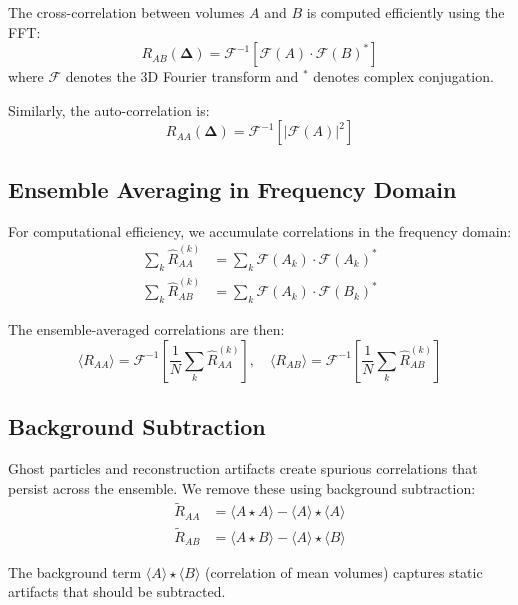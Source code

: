 \documentclass[11pt,a4paper]{article}
\begin{document}
The cross-correlation between volumes $A$ and $B$ is computed efficiently using the FFT:
\begin{equation}
    R_{AB}(\bm{\Delta}) = \mathcal{F}^{-1}\left[\mathcal{F}(A) \cdot \mathcal{F}(B)^*\right]
\end{equation}
where $\mathcal{F}$ denotes the 3D Fourier transform and $^*$ denotes complex conjugation.

Similarly, the auto-correlation is:
\begin{equation}
    R_{AA}(\bm{\Delta}) = \mathcal{F}^{-1}\left[|\mathcal{F}(A)|^2\right]
\end{equation}

\subsection{Ensemble Averaging in Frequency Domain}

For computational efficiency, we accumulate correlations in the frequency domain:
\begin{align}
    \sum_k \hat{R}_{AA}^{(k)} &= \sum_k \mathcal{F}(A_k) \cdot \mathcal{F}(A_k)^* \\
    \sum_k \hat{R}_{AB}^{(k)} &= \sum_k \mathcal{F}(A_k) \cdot \mathcal{F}(B_k)^*
\end{align}

The ensemble-averaged correlations are then:
\begin{equation}
    \langle R_{AA} \rangle = \mathcal{F}^{-1}\left[\frac{1}{N}\sum_k \hat{R}_{AA}^{(k)}\right], \quad
    \langle R_{AB} \rangle = \mathcal{F}^{-1}\left[\frac{1}{N}\sum_k \hat{R}_{AB}^{(k)}\right]
\end{equation}

\subsection{Background Subtraction}

Ghost particles and reconstruction artifacts create spurious correlations that persist across the ensemble. We remove these using background subtraction:
\begin{align}
    \tilde{R}_{AA} &= \langle A \star A \rangle - \langle A \rangle \star \langle A \rangle \\
    \tilde{R}_{AB} &= \langle A \star B \rangle - \langle A \rangle \star \langle B \rangle
\end{align}

The background term $\langle A \rangle \star \langle B \rangle$ (correlation of mean volumes) captures static artifacts that should be subtracted.
\end{document}
